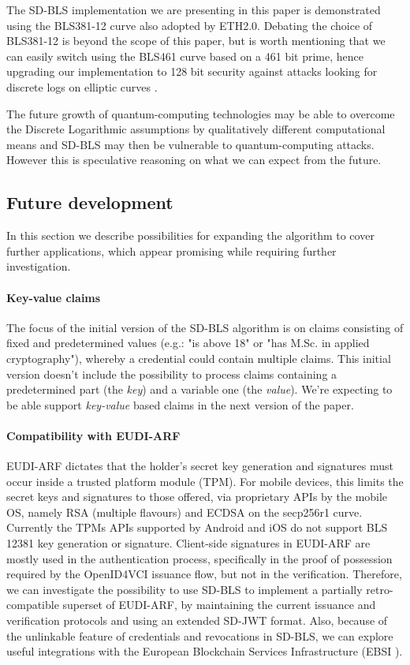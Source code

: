 The SD-BLS implementation we are presenting in this paper is
demonstrated using the BLS381-12 curve \cite{bls381-12} also adopted
by ETH2.0. Debating the choice of BLS381-12 is beyond the scope of
this paper, but is worth mentioning that we can easily switch using the BLS461 curve based on a 461 bit prime, hence upgrading our
implementation to 128 bit security \cite{updating-key-pairings}
against attacks looking for discrete logs on elliptic curves
\cite{discrete-log-attack}.

The future growth
of quantum-computing technologies may be able to overcome the Discrete
Logarithmic assumptions by qualitatively different computational
means and SD-BLS may then be vulnerable to quantum-computing attacks. However this is speculative reasoning on what we can expect from the
future.

\subsection{Future development}
In this section we describe possibilities for expanding the algorithm to cover further applications, which appear promising while requiring further investigation.

\paragraph{Key-value claims}
The focus of the initial version of the SD-BLS algorithm is on claims consisting of fixed and predetermined values (e.g.: "is above 18" or "has M.Sc. in applied cryptography"), whereby a credential could contain multiple claims. This initial version doesn't include the possibility to process claims containing a predetermined part (the \textit{key}) and a variable one (the \textit{value}). We're expecting to be able support \textit{key-value} based claims in the next version of the paper.

\paragraph{Compatibility with EUDI-ARF}
EUDI-ARF dictates that the holder's secret key generation and signatures must occur inside a trusted platform module (TPM). For mobile devices, this limits the secret keys and signatures to those offered, via proprietary APIs by the mobile OS, namely RSA (multiple flavours) and ECDSA on the secp256r1 curve. Currently the TPMs APIs supported by Android and iOS do not support BLS 12381 key generation or signature.
Client-side signatures in EUDI-ARF are mostly used in the authentication process, specifically in the proof of possession required by the OpenID4VCI\cite{OID4VCI} issuance flow, but not in the verification.
Therefore, we can investigate the possibility to use SD-BLS to implement a partially retro-compatible superset of EUDI-ARF, by maintaining the current issuance and verification protocols and using an extended SD-JWT format. Also, because of the unlinkable feature of credentials and revocations in SD-BLS, we can explore useful integrations with the European Blockchain Services Infrastructure (EBSI \cite{ebsi}).


